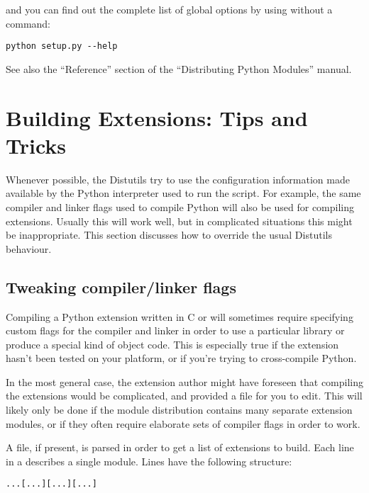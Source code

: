 \documentclass{howto}
\begin{document}
and you can find out the complete list of global options by using
 without a command:

\begin{verbatim}
python setup.py --help
\end{verbatim}

See also the ``Reference'' section of the ``Distributing Python
Modules'' manual.

\section{Building Extensions: Tips and Tricks}
\label{building-ext}

Whenever possible, the Distutils try to use the configuration
information made available by the Python interpreter used to run the
 script.  For example, the same compiler and linker
flags used to compile Python will also be used for compiling
extensions.  Usually this will work well, but in complicated
situations this might be inappropriate.  This section discusses how to
override the usual Distutils behaviour.

\subsection{Tweaking compiler/linker flags}
\label{tweak-flags}

Compiling a Python extension written in C or \Cpp{} will sometimes
require specifying custom flags for the compiler and linker in order
to use a particular library or produce a special kind of object code.
This is especially true if the extension hasn't been tested on your 
platform, or if you're trying to cross-compile Python.

In the most general case, the extension author might have foreseen
that compiling the extensions would be complicated, and provided a
 file for you to edit.  This will likely only be done if
the module distribution contains many separate extension modules, or
if they often require elaborate sets of compiler flags in order to work.

A  file, if present, is parsed in order to get a list of
extensions to build.  Each line in a  describes a single
module.  Lines have the following structure:

\begin{alltt}
 ... [ ...] [ ...] [ ...]
\end{alltt}
\end{document}
